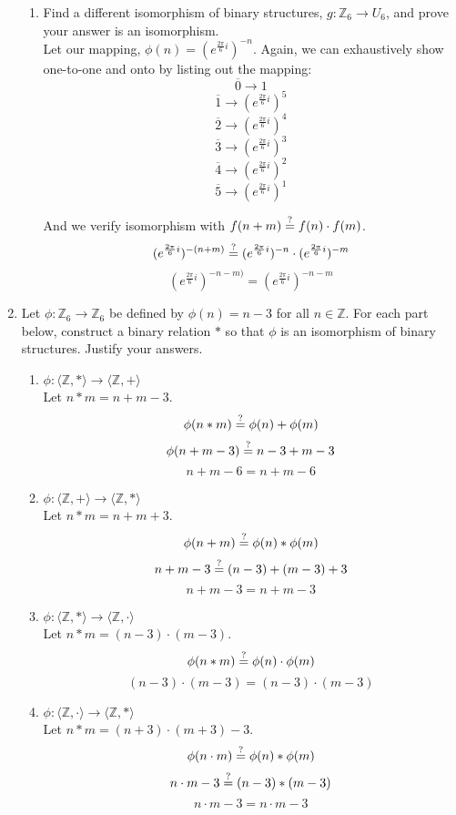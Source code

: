 \begin{enumerate}
\begin{enumerate}
\item Find a different isomorphism of binary structures, $g : \mathds{Z}_6 \rightarrow U_6$, and prove your answer is an isomorphism.\\

Let our mapping, $\phi(n) = (e^{\frac{2\pi}{6}i})^{-n}$. Again, we can exhaustively show one-to-one and onto by listing out the mapping:
$$\overline{0} \rightarrow 1$$
$$\overline{1} \rightarrow (e^{\frac{2\pi}{6}i})^5$$
$$\overline{2} \rightarrow (e^{\frac{2\pi}{6}i})^4$$
$$\overline{3} \rightarrow (e^{\frac{2\pi}{6}i})^3$$
$$\overline{4} \rightarrow (e^{\frac{2\pi}{6}i})^2$$
$$\overline{5} \rightarrow (e^{\frac{2\pi}{6}i})^1$$

And we verify isomorphism with $f(n+m) \stackrel{?}{=} f(n) \cdot f(m)$.
$$(e^{\frac{2\pi}{6}i})^{-(n+m)} \stackrel{?}{=} (e^{\frac{2\pi}{6}i})^{-n} \cdot (e^{\frac{2\pi}{6}i})^{-m}$$
$$(e^{\frac{2\pi}{6}i})^{-n-m)} = (e^{\frac{2\pi}{6}i})^{-n-m}$$

\end{enumerate}

\item Let $\phi: \mathds{Z}_6 \rightarrow \mathds{Z}_6$ be defined by $\phi(n) = n - 3$ for all $n \in \mathds{Z}$. For each part below, construct a binary relation $*$ so that $\phi$ is an isomorphism of binary structures. Justify your answers.\\

\begin{enumerate}
\item $\phi: \langle \mathds{Z}, * \rangle \rightarrow \langle \mathds{Z}, + \rangle$\\

Let $n * m = n + m - 3$.
$$\phi(n*m) \stackrel{?}{=} \phi(n) + \phi(m)$$
$$\phi(n + m - 3) \stackrel{?}{=} n - 3 + m - 3$$
$$n + m - 6 = n + m - 6$$

\item $\phi: \langle \mathds{Z}, + \rangle \rightarrow \langle \mathds{Z}, * \rangle$\\

Let $n * m = n + m + 3$.
$$\phi(n+m) \stackrel{?}{=} \phi(n) * \phi(m)$$
$$n + m - 3 \stackrel{?}{=} (n-3) + (m-3) + 3$$
$$n + m - 3 = n + m - 3$$

\item $\phi: \langle \mathds{Z}, * \rangle \rightarrow \langle \mathds{Z}, \cdot \rangle$\\

Let $n * m = (n-3) \cdot (m-3)$.
$$\phi(n*m) \stackrel{?}{=} \phi(n) \cdot \phi(m)$$
$$(n-3) \cdot (m-3) = (n-3) \cdot (m-3)$$

\item $\phi: \langle \mathds{Z}, \cdot \rangle \rightarrow \langle \mathds{Z}, * \rangle$\\

Let $n * m = (n+3) \cdot (m+3) - 3$.
$$\phi(n \cdot m) \stackrel{?}{=} \phi(n) * \phi(m)$$
$$n \cdot m - 3 \stackrel{?}{=} (n-3) * (m-3)$$
$$n \cdot m - 3 = n \cdot m - 3$$
\end{enumerate}

\end{enumerate}


